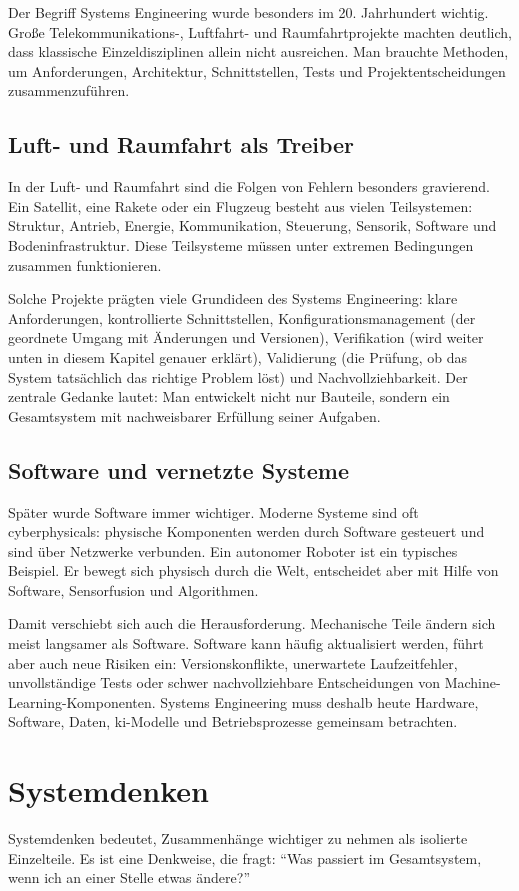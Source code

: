 Der Begriff Systems Engineering wurde besonders im 20. Jahrhundert wichtig. Große Telekommunikations-, Luftfahrt- und Raumfahrtprojekte machten deutlich, dass klassische Einzeldisziplinen allein nicht ausreichen. Man brauchte Methoden, um Anforderungen, Architektur, Schnittstellen, Tests und Projektentscheidungen zusammenzuführen.

\subsection{Luft- und Raumfahrt als Treiber}
In der Luft- und Raumfahrt sind die Folgen von Fehlern besonders gravierend. Ein Satellit, eine Rakete oder ein Flugzeug besteht aus vielen Teilsystemen: Struktur, Antrieb, Energie, Kommunikation, Steuerung, Sensorik, Software und Bodeninfrastruktur. Diese Teilsysteme müssen unter extremen Bedingungen zusammen funktionieren.

Solche Projekte prägten viele Grundideen des Systems Engineering: klare Anforderungen, kontrollierte Schnittstellen, Konfigurationsmanagement (der geordnete Umgang mit Änderungen und Versionen), Verifikation (wird weiter unten in diesem Kapitel genauer erklärt), Validierung (die Prüfung, ob das System tatsächlich das richtige Problem löst) und Nachvollziehbarkeit. Der zentrale Gedanke lautet: Man entwickelt nicht nur Bauteile, sondern ein Gesamtsystem mit nachweisbarer Erfüllung seiner Aufgaben.

\subsection{Software und vernetzte Systeme}
Später wurde Software immer wichtiger. Moderne Systeme sind oft \glspl{cyberphysical}: physische Komponenten werden durch Software gesteuert und sind über Netzwerke verbunden. Ein autonomer Roboter ist ein typisches Beispiel. Er bewegt sich physisch durch die Welt, entscheidet aber mit Hilfe von Software, Sensorfusion und Algorithmen.

Damit verschiebt sich auch die Herausforderung. Mechanische Teile ändern sich meist langsamer als Software. Software kann häufig aktualisiert werden, führt aber auch neue Risiken ein: Versionskonflikte, unerwartete Laufzeitfehler, unvollständige Tests oder schwer nachvollziehbare Entscheidungen von Machine-Learning-Komponenten. Systems Engineering muss deshalb heute Hardware, Software, Daten, \gls{ki}-Modelle und Betriebsprozesse gemeinsam betrachten.

\section{Systemdenken}
Systemdenken bedeutet, Zusammenhänge wichtiger zu nehmen als isolierte Einzelteile. Es ist eine Denkweise, die fragt: \enquote{Was passiert im Gesamtsystem, wenn ich an einer Stelle etwas ändere?}

